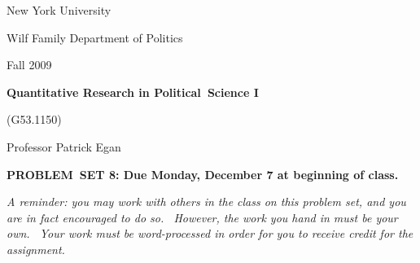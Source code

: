 \documentclass[11pt]{article}
\begin{document}
New York University

Wilf Family Department of Politics

Fall 2009

\begin{center}
{\large \textbf{Quantitative Research in Political\ Science I}}

(G53.1150)

Professor Patrick Egan

\bigskip

\textbf{PROBLEM\ SET 8: Due Monday, December 7 at beginning of class.}
\end{center}

\textit{A reminder: you may work with others in the class on this problem
set, and you are in fact encouraged to do so. \ However, the work you hand
in must be your own. \ Your work must be word-processed in order for you to
receive credit for the assignment.}
\end{document}
